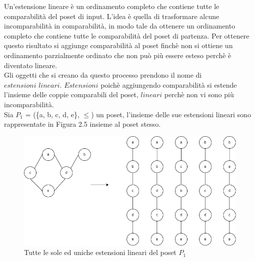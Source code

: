 \documentclass[a4paper,12pt, openright]{report}
\begin{document}
Un'estensione lineare è un ordinamento completo che contiene tutte le comparabilità del poset di input.  
L'idea è quella di trasformare alcune incomparabilità in comparabilità, in modo tale da ottenere un ordinamento completo che contiene tutte 
le comparabilità del poset di partenza. Per ottenere questo risultato si aggiunge comparabilità al poset finchè non si ottiene un ordinamento parzialmente
ordinato che non
può più essere esteso perchè è diventato lineare. \\
Gli oggetti che si creano da questo processo prendono il nome di $\textit{estensioni lineari}$. $\textit{Estensioni}$ poichè aggiungendo comparabilità
si estende l'insieme delle coppie comparabili del poset, $\textit{lineari}$ perchè non vi sono più incomparabilità. \\
Sia $P_1$ = (\{a, b, c, d, e\}, $\leq$) un poset, l'insieme delle sue estensioni lineari sono rappresentate in Figura 2.5 insieme 
al poset stesso. 
\begin{figure}[H]
    \centering
    \includegraphics[scale=.5]{estensione_lin.png}
    \caption{Tutte le sole ed uniche estensioni lineari del poset $P_1$}
\end{figure}
\end{document}
